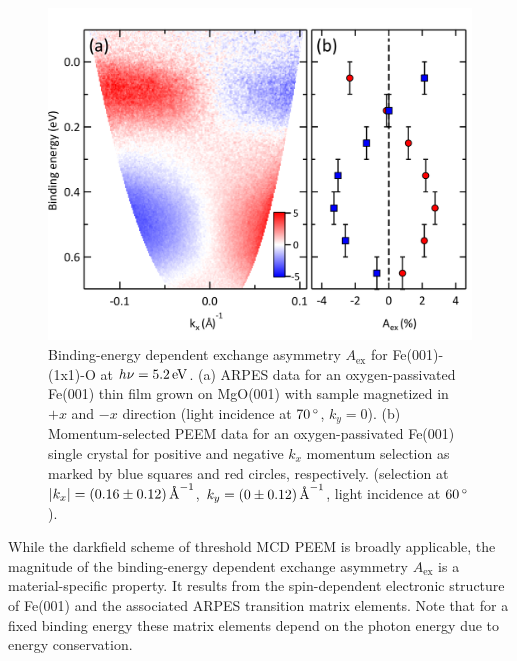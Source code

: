 \documentclass[prl,twocolumn,floatfix,superscriptaddress,aps]{revtex4-2}
\begin{document}
\begin{figure}
    \centering
    \includegraphics[width = 0.9\columnwidth]{FePaperFigARPES2.pdf}
    \caption{Binding-energy dependent exchange asymmetry $A_{\mathrm{ex}}$ for Fe(001)-(1x1)-O at $h\nu = \unit[5.2]{eV}$. (a) ARPES data for an oxygen-passivated Fe(001) thin film grown on MgO(001) with sample magnetized in $+x$ and $-x$ direction (light incidence at $\unit[70]{^{\circ}}$, $k_y = 0$). (b) Momentum-selected PEEM data for an oxygen-passivated Fe(001) single crystal for positive and negative $k_x$ momentum selection as marked by blue squares and red circles, respectively. (selection at $|k_x| = \unit[(0.16 \pm 0.12)]{\text{\AA}^{-1}}$, $k_y = \unit[(0 \pm 0.12)]{\text{\AA}^{-1}}$, light incidence at $\unit[60]{^{\circ}}$).}
    \label{fig:AexContrast}
\end{figure}

While the darkfield scheme of threshold MCD PEEM is broadly applicable, the magnitude of the binding-energy dependent exchange asymmetry $A_{\mathrm{ex}}$ is a material-specific property. It results from the spin-dependent electronic structure of Fe(001) and the associated ARPES  transition matrix elements. Note that for a fixed binding energy these matrix elements depend on the photon energy due to energy conservation.
\end{document}
